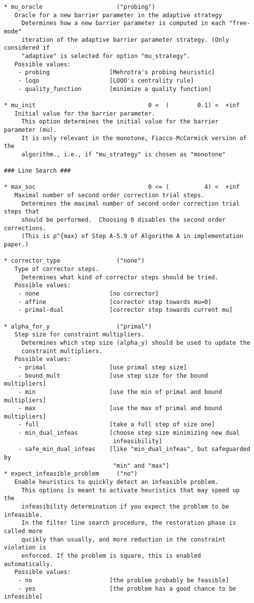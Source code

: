 \documentclass[letter,10pt]{article}
\begin{document}
{\begin{verbatim}
* mu_oracle                     ("probing")
   Oracle for a new barrier parameter in the adaptive strategy
     Determines how a new barrier parameter is computed in each "free-mode"
     iteration of the adaptive barrier parameter strategy. (Only considered if
     "adaptive" is selected for option "mu_strategy".
   Possible values:
    - probing                 [Mehrotra's probing heuristic]
    - loqo                    [LOQO's centrality rule]
    - quality_function        [minimize a quality function]

* mu_init                                0 <  (        0.1) <  +inf      
   Initial value for the barrier parameter.
     This option determines the initial value for the barrier parameter (mu). 
     It is only relevant in the monotone, Fiacco-McCormick version of the
     algorithm., i.e., if "mu_strategy" is chosen as "monotone"

### Line Search ###

* max_soc                                0 <= (          4) <  +inf      
   Maximal number of second order correction trial steps.
     Determines the maximal number of second order correction trial steps that
     should be performed.  Choosing 0 disables the second order corrections.
     (This is p^{max} of Step A-5.9 of Algorithm A in implementation paper.)

* corrector_type                ("none")
   Type of corrector steps.
     Determines what kind of corrector steps should be tried.
   Possible values:
    - none                    [no corrector]
    - affine                  [corrector step towards mu=0]
    - primal-dual             [corrector step towards current mu]

* alpha_for_y                   ("primal")
   Step size for constraint multipliers.
     Determines which step size (alpha_y) should be used to update the
     constraint multipliers.
   Possible values:
    - primal                  [use primal step size]
    - bound_mult              [use step size for the bound multipliers]
    - min                     [use the min of primal and bound multipliers]
    - max                     [use the max of primal and bound multipliers]
    - full                    [take a full step of size one]
    - min_dual_infeas         [choose step size minimizing new dual
                               infeasibility]
    - safe_min_dual_infeas    [like "min_dual_infeas", but safeguarded by
                               "min" and "max"]
* expect_infeasible_problem     ("no")
   Enable heuristics to quickly detect an infeasible problem.
     This options is meant to activate heuristics that may speed up the
     infeasibility determination if you expect the problem to be infeasible. 
     In the filter line search procedure, the restoration phase is called more
     qucikly than usually, and more reduction in the constraint violation is
     enforced. If the problem is square, this is enabled automatically.
   Possible values:
    - no                      [the problem probably be feasible]
    - yes                     [the problem has a good chance to be infeasible]


\end{verbatim}}
\end{document}

